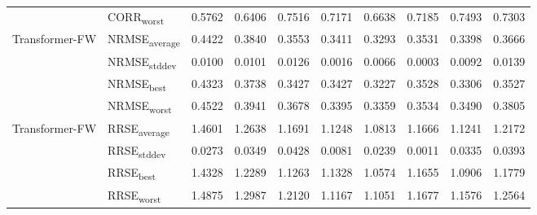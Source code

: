 {\begin{longtable}{l l c c c c c c c c}
 & CORR\textsubscript{worst} & 0.5762 & 0.6406 & 0.7516 & 0.7171 & 0.6638 & 0.7185 & 0.7493 & 0.7303 \\
\cmidrule(lr){2-10}
\multirow{4}{*}{Transformer-FW} & NRMSE\textsubscript{average} & 0.4422 & 0.3840 & 0.3553 & 0.3411 & 0.3293 & 0.3531 & 0.3398 & 0.3666 \\
 & NRMSE\textsubscript{stddev} & 0.0100 & 0.0101 & 0.0126 & 0.0016 & 0.0066 & 0.0003 & 0.0092 & 0.0139 \\
 & NRMSE\textsubscript{best} & 0.4323 & 0.3738 & 0.3427 & 0.3427 & 0.3227 & 0.3528 & 0.3306 & 0.3527 \\
 & NRMSE\textsubscript{worst} & 0.4522 & 0.3941 & 0.3678 & 0.3395 & 0.3359 & 0.3534 & 0.3490 & 0.3805 \\
\cmidrule(lr){2-10}
\multirow{4}{*}{Transformer-FW} & RRSE\textsubscript{average} & 1.4601 & 1.2638 & 1.1691 & 1.1248 & 1.0813 & 1.1666 & 1.1241 & 1.2172 \\
 & RRSE\textsubscript{stddev} & 0.0273 & 0.0349 & 0.0428 & 0.0081 & 0.0239 & 0.0011 & 0.0335 & 0.0393 \\
 & RRSE\textsubscript{best} & 1.4328 & 1.2289 & 1.1263 & 1.1328 & 1.0574 & 1.1655 & 1.0906 & 1.1779 \\
 & RRSE\textsubscript{worst} & 1.4875 & 1.2987 & 1.2120 & 1.1167 & 1.1051 & 1.1677 & 1.1576 & 1.2564 \\
\cmidrule(lr){2-10}
\end{longtable}
}
